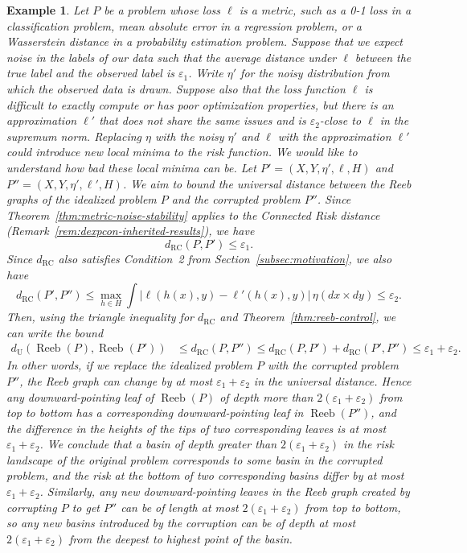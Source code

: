 \documentclass[twoside,11pt]{article}
\newtheorem{examples}[theorem]{Example}
\newcommand{\dexpcon}[1][]{d_{\operatorname{RC}#1}}
\DeclareMathOperator{\reeb}{Reeb}
\renewcommand{\epsilon}{\varepsilon}
\begin{document}
    \begin{examples}
        Let $P$ be a problem whose loss $\ell$ is a metric, such as a 0-1 loss in a classification problem, mean absolute error in a regression problem, or a Wasserstein distance in a probability estimation problem. Suppose that we expect noise in the labels of our data such that the average distance under $\ell$ between the true label and the observed label is $\epsilon_1$. Write $\eta'$ for the noisy distribution from which the observed data is drawn. Suppose also that the loss function $\ell$ is difficult to exactly compute or has poor optimization properties, but there is an approximation $\ell'$ that does not share the same issues and is $\epsilon_2$-close to $\ell$ in the supremum norm. Replacing $\eta$ with the noisy $\eta'$ and $\ell$ with the approximation $\ell'$ could introduce new local minima to the risk function. We would like to understand how bad these local minima can be. Let $P' = (X,Y,\eta',\ell,H)$ and $P'' = (X,Y,\eta',\ell',H)$. We aim to bound the universal distance between the Reeb graphs of the idealized problem $P$ and the corrupted problem $P''$. Since Theorem~\ref{thm:metric-noise-stability} applies to the Connected Risk distance (Remark~\ref{rem:dexpcon-inherited-results}), we have
        \[\dexpcon(P,P')\leq \epsilon_1.\]
        Since $\dexpcon$ also satisfies Condition~2 from Section~\ref{subsec:motivation}, we also have
        \[\dexpcon(P',P'') \leq \max_{h\in H} \int \big|\ell(h(x),y) - \ell'(h(x),y)\big|\, \eta(dx{\times}dy) \leq \epsilon_2.\]
        Then, using the triangle inequality for $\dexpcon$ and Theorem~\ref{thm:reeb-control}, we can write the bound
        \begin{align*}
            d_{\mathrm{U}}(\reeb(P),\reeb(P')) & \leq \dexpcon(P,P'') \leq \dexpcon(P,P') + \dexpcon(P',P'') \leq \epsilon_1 + \epsilon_2.
        \end{align*}
        In other words, if we replace the idealized problem $P$ with the corrupted problem $P''$, the Reeb graph can change by at most $\epsilon_1 + \epsilon_2$ in the universal distance. Hence any downward-pointing leaf of $\reeb(P)$ of depth more than $2(\epsilon_1 + \epsilon_2)$ from top to bottom has a corresponding downward-pointing leaf in $\reeb(P'')$, and the difference in the heights of the tips of two corresponding leaves is at most $\epsilon_1 + \epsilon_2$. We conclude that a basin of depth greater than $2(\epsilon_1 + \epsilon_2)$ in the risk landscape of the original problem corresponds to some basin in the corrupted problem, and the risk at the bottom of two corresponding basins differ by at most $\epsilon_1 + \epsilon_2$. Similarly, any new downward-pointing leaves in the Reeb graph created by corrupting $P$ to get $P''$ can be of length at most $2(\epsilon_1 + \epsilon_2)$ from top to bottom, so any new basins introduced by the corruption can be of depth at most $2(\epsilon_1 + \epsilon_2)$ from the deepest to highest point of the basin. 
    \end{examples}
\end{document}
